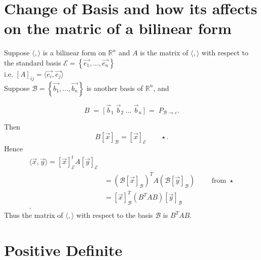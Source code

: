 \documentclass{report}
\begin{document}
  \section{Change of Basis and how its affects on the matric of a bilinear form}
  Suppose $ \langle ,  \rangle $ is a bilinear form on  $ \mathbb{R} ^{n}$ and $ A$ is the matrix of $ \langle ,  \rangle $ with respect to the standard basis $ \mathcal{E} = \left\{ \vec{ e_1}, \ldots , \vec{ e_n}  \right\} $\\
  i.e.  $ \left[ A \right] _{ i j } = \langle \vec{ e_i} , \vec{ e_j}   \rangle $ \\
  Suppose $ \mathcal{B} = \left\{ \vec{ b_1}, \ldots , \vec{ b_n}  \right\} $ is another basis of $ \mathbb{R} ^{n}$, and 
  
    \[
B \;=\;
\bigl[\,\vec b_{1}\;\vec b_{2}\;\dots\;\vec b_{n}\,\bigr]
\;=\;
P_{\mathcal B \to \varepsilon}.
\]

  Then 
  \[
   B \left[ \vec{ x}  \right]  _{ \mathcal{B}} = \left[ \vec{ x}  \right] _{ \mathcal{E}} \qquad  \star
  .\] 
 Hence 
 \begin{align*}
  \langle \vec{ x} , \vec{ y}\rangle  = \left[ \vec{ x}  \right] _{ \mathcal{E}} ^{t} A  \left[ \vec{ y}  \right] _{ \mathcal{E}} \\
  &= \left( \mathcal{B} \left[ \vec{ x}  \right] _{ \mathcal{B}} \right) ^{T} A \left( \mathcal{B} \left[ \vec{ y}  \right] _{ \mathcal{B}} \right) \qquad  \text{ from } \star\\
  &= \left[ \vec{ x}  \right] _{ \mathcal{B}} ^{T} \left( B ^{T} A B \right) \left[ \vec{ y}  \right] _{ \mathcal{B}}\\
 .\end{align*}
 Thus the matrix of $ \langle  , \rangle $ with respect to the basis $ \mathcal{B}$ is $ B ^{T}A B$.\\
 \section{Positive Definite}
  
\end{document}
